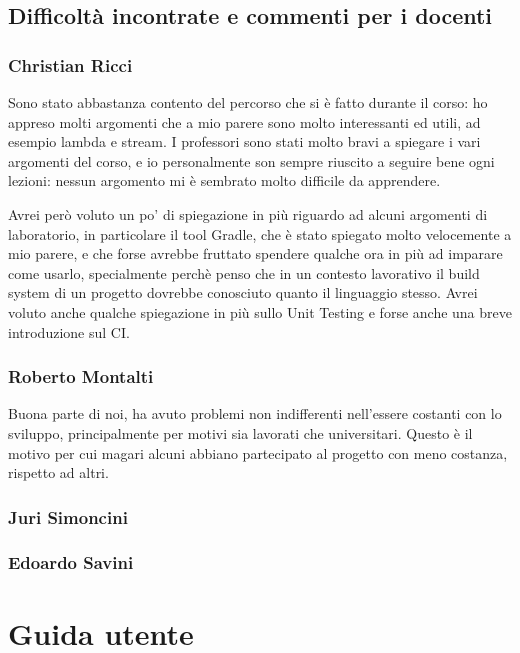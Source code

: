 \section{Difficoltà incontrate e commenti per i docenti}

\subsection{Christian Ricci}

Sono stato abbastanza contento del percorso che si è fatto durante il corso: ho appreso molti argomenti che a mio parere sono molto interessanti ed utili, ad esempio lambda e stream. I professori sono stati molto bravi a spiegare i vari argomenti del corso, e io personalmente son sempre riuscito a seguire bene ogni lezioni: nessun argomento mi è sembrato molto difficile da apprendere.

Avrei però voluto un po' di spiegazione in più riguardo ad alcuni argomenti di laboratorio, in particolare il tool Gradle, che è stato spiegato molto velocemente a mio parere, e che forse avrebbe fruttato spendere qualche ora in più ad imparare come usarlo, specialmente perchè penso che in un contesto lavorativo il build system di un progetto dovrebbe conosciuto quanto il linguaggio stesso. Avrei voluto anche qualche spiegazione in più sullo Unit Testing e forse anche una breve introduzione sul CI.

\subsection{Roberto Montalti}

Buona parte di noi, ha avuto problemi non indifferenti nell'essere costanti con lo sviluppo, principalmente per motivi sia lavorati che universitari.
Questo è il motivo per cui magari alcuni abbiano partecipato al progetto con meno costanza, rispetto ad altri.

\subsection{Juri Simoncini}

\subsection{Edoardo Savini}

\appendix

\chapter{Guida utente}

